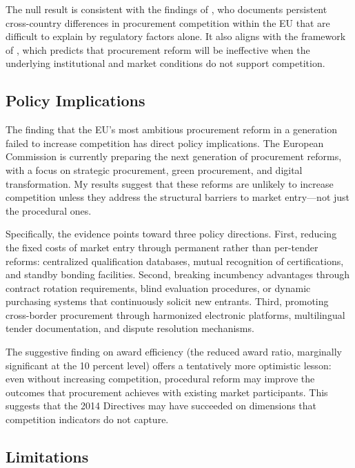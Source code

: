 \documentclass[12pt]{article}
\begin{document}
The null result is consistent with the findings of \citet{szucs2023}, who documents persistent cross-country differences in procurement competition within the EU that are difficult to explain by regulatory factors alone. It also aligns with the framework of \citet{bosio2022}, which predicts that procurement reform will be ineffective when the underlying institutional and market conditions do not support competition.

\subsection{Policy Implications}

The finding that the EU's most ambitious procurement reform in a generation failed to increase competition has direct policy implications. The European Commission is currently preparing the next generation of procurement reforms, with a focus on strategic procurement, green procurement, and digital transformation. My results suggest that these reforms are unlikely to increase competition unless they address the structural barriers to market entry---not just the procedural ones.

Specifically, the evidence points toward three policy directions. First, reducing the fixed costs of market entry through permanent rather than per-tender reforms: centralized qualification databases, mutual recognition of certifications, and standby bonding facilities. Second, breaking incumbency advantages through contract rotation requirements, blind evaluation procedures, or dynamic purchasing systems that continuously solicit new entrants. Third, promoting cross-border procurement through harmonized electronic platforms, multilingual tender documentation, and dispute resolution mechanisms.

The suggestive finding on award efficiency (the reduced award ratio, marginally significant at the 10 percent level) offers a tentatively more optimistic lesson: even without increasing competition, procedural reform may improve the outcomes that procurement achieves with existing market participants. This suggests that the 2014 Directives may have succeeded on dimensions that competition indicators do not capture.

\subsection{Limitations}
\end{document}
